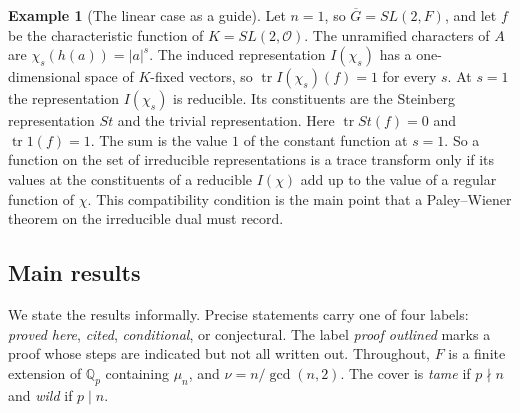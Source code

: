 \documentclass[12pt,letterpaper]{article}
\numberwithin{equation}{section}
\theoremstyle{definition}
\newtheorem{xexample}[theorem]{Example}
\newcommand{\proved}{proved here}
\newcommand{\cited}{cited}
\newcommand{\cond}{conditional}
\newcommand{\outl}{proof outlined}
\newcommand{\Q}{\mathbb Q}
\newcommand{\OF}{\mathcal O}
\newcommand{\bG}{\overline{G}}
\DeclareMathOperator{\tr}{tr}
\begin{document}
\begin{xexample}[The linear case as a guide]\label{ex:intro-linear}
Let $n=1$, so $\bG=SL(2,F)$, and let $f$ be the characteristic function of
$K=SL(2,\OF)$.  The unramified characters of $A$ are $\chi_s(h(a))=|a|^s$.  The induced
representation $I(\chi_s)$ has a one-dimensional space of $K$-fixed vectors, so
$\tr I(\chi_s)(f)=1$ for every $s$.  At $s=1$ the representation $I(\chi_s)$ is reducible.
Its constituents are the Steinberg representation $St$ and the trivial representation.
Here $\tr St(f)=0$ and $\tr 1(f)=1$.  The sum is the value $1$ of the constant function
at $s=1$.  So a function on the set of irreducible representations is a trace transform
only if its values at the constituents of a reducible $I(\chi)$ add up to the value of a
regular function of $\chi$.  This compatibility condition is the main point that a
Paley--Wiener theorem on the irreducible dual must record.
\end{xexample}

\subsection*{Main results}
We state the results informally.  Precise statements carry one of four labels: \emph{\proved},
\emph{\cited}, \emph{\cond}, or conjectural.  The label \emph{\outl} marks a proof whose
steps are indicated but not all written out.  Throughout, $F$ is a finite extension of
$\Q_p$ containing $\mu_n$, and $\nu=n/\gcd(n,2)$.  The cover is \emph{tame} if $p\nmid n$
and \emph{wild} if $p\mid n$.
\end{document}
